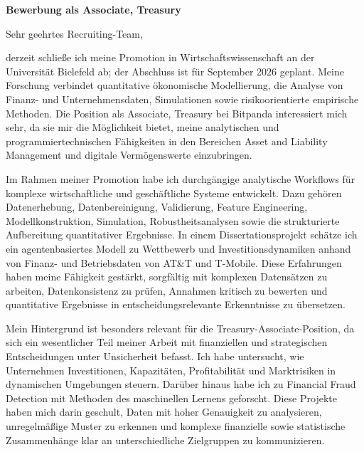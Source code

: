 \documentclass[11pt]{article}
\begin{document}
\vspace{0.05cm}

\noindent
\textbf{Bewerbung als Associate, Treasury} 

\noindent Sehr geehrtes Recruiting-Team,

derzeit schlie\ss{}e ich meine Promotion in Wirtschaftswissenschaft an der Universität Bielefeld ab; der Abschluss ist für September 2026 geplant. Meine Forschung verbindet quantitative ökonomische Modellierung, die Analyse von Finanz- und Unternehmensdaten, Simulationen sowie risikoorientierte empirische Methoden. Die Position als Associate, Treasury bei Bitpanda interessiert mich sehr, da sie mir die Möglichkeit bietet, meine analytischen und programmiertechnischen Fähigkeiten in den Bereichen Asset and Liability Management und digitale Vermögenswerte einzubringen.

Im Rahmen meiner Promotion habe ich durchgängige analytische Workflows für komplexe wirtschaftliche und geschäftliche Systeme entwickelt. Dazu gehören Datenerhebung, Datenbereinigung, Validierung, Feature Engineering, Modellkonstruktion, Simulation, Robustheitsanalysen sowie die strukturierte Aufbereitung quantitativer Ergebnisse. In einem Dissertationsprojekt schätze ich ein agentenbasiertes Modell zu Wettbewerb und Investitionsdynamiken anhand von Finanz- und Betriebsdaten von AT\&T und T-Mobile. Diese Erfahrungen haben meine Fähigkeit gestärkt, sorgfältig mit komplexen Datensätzen zu arbeiten, Datenkonsistenz zu prüfen, Annahmen kritisch zu bewerten und quantitative Ergebnisse in entscheidungsrelevante Erkenntnisse zu übersetzen.

Mein Hintergrund ist besonders relevant für die Treasury-Associate-Position, da sich ein wesentlicher Teil meiner Arbeit mit finanziellen und strategischen Entscheidungen unter Unsicherheit befasst. Ich habe untersucht, wie Unternehmen Investitionen, Kapazitäten, Profitabilität und Marktrisiken in dynamischen Umgebungen steuern. Darüber hinaus habe ich zu Financial Fraud Detection mit Methoden des maschinellen Lernens geforscht. Diese Projekte haben mich darin geschult, Daten mit hoher Genauigkeit zu analysieren, unregelmä\ss{}ige Muster zu erkennen und komplexe finanzielle sowie statistische Zusammenhänge klar an unterschiedliche Zielgruppen zu kommunizieren.
\end{document}
